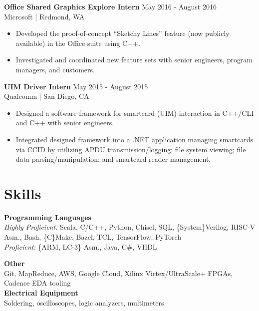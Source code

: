 \documentclass[line]{res}
\begin{document}
\begin{resume}
\vspace{-3mm}

\textbf{Office Shared Graphics Explore Intern} \hfill May 2016 - August 2016
\\
Microsoft | Redmond, WA
\\
\vspace{-3mm}
\begin{itemize}
\item Developed the proof-of-concept ``Sketchy Lines'' feature (now publicly available) in the Office suite using C++.
\item Investigated and coordinated new feature sets with senior engineers, program managers, and customers.
\end{itemize}

\vspace{-3mm}

\textbf{UIM Driver Intern} \hfill May 2015 - August 2015
\\
Qualcomm | San Diego, CA
\\
\vspace{-3mm}
\begin{itemize}
\item Designed a software framework for smartcard (UIM) interaction in C++/CLI and C++ with senior engineers.
\item Integrated designed framework into a .NET application managing smartcards via CCID by utilizing APDU transmission/logging; file system viewing; file data parsing/manipulation; and smartcard reader management.
\end{itemize}

\vspace{-3mm}

\section{\Large{Skills}}
\label{sec:skills}
\vspace{1mm}

\begin{multicols}{2}
\textbf{Programming Languages}
\\
\textit{Highly Proficient:} Scala, C/C++, Python, Chisel, SQL, \{System\}Verilog, RISC-V Asm., Bash, \{C\}Make, Bazel, TCL, TensorFlow, PyTorch
\\
\textit{Proficient:} \{ARM, LC-3\} Asm., Java, C\#, VHDL

\columnbreak

\textbf{Other}
\\
Git, MapReduce, AWS, Google Cloud, Xilinx Virtex/UltraScale+ FPGAs, Cadence EDA tooling
\vspace{1mm}
\\
\textbf{Electrical Equipment}
\\
Soldering, oscilloscopes, logic analyzers, multimeters


\end{multicols}
\end{resume}
\end{document}
